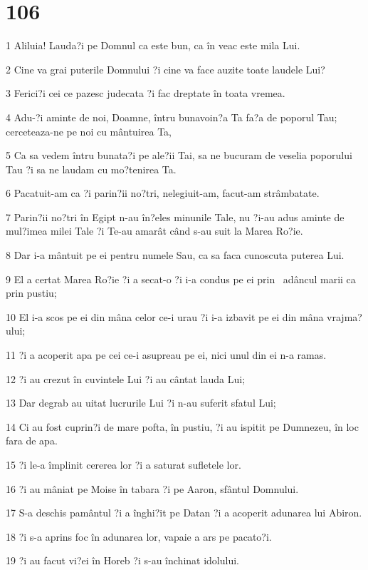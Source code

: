\chapter{106}

\par 1 Aliluia! Lauda?i pe Domnul ca este bun, ca în veac este mila Lui.
\par 2 Cine va grai puterile Domnului ?i cine va face auzite toate laudele Lui?
\par 3 Ferici?i cei ce pazesc judecata ?i fac dreptate în toata vremea.
\par 4 Adu-?i aminte de noi, Doamne, întru bunavoin?a Ta fa?a de poporul Tau; cerceteaza-ne pe noi cu mântuirea Ta,
\par 5 Ca sa vedem întru bunata?i pe ale?ii Tai, sa ne bucuram de veselia poporului Tau ?i sa ne laudam cu mo?tenirea Ta.
\par 6 Pacatuit-am ca ?i parin?ii no?tri, nelegiuit-am, facut-am strâmbatate.
\par 7 Parin?ii no?tri în Egipt n-au în?eles minunile Tale, nu ?i-au adus aminte de mul?imea milei Tale ?i Te-au amarât când s-au suit la Marea Ro?ie.
\par 8 Dar i-a mântuit pe ei pentru numele Sau, ca sa faca cunoscuta puterea Lui.
\par 9 El a certat Marea Ro?ie ?i a secat-o ?i i-a condus pe ei prin  adâncul marii ca prin pustiu;
\par 10 El i-a scos pe ei din mâna celor ce-i urau ?i i-a izbavit pe ei din mâna vrajma?ului;
\par 11 ?i a acoperit apa pe cei ce-i asupreau pe ei, nici unul din ei n-a ramas.
\par 12 ?i au crezut în cuvintele Lui ?i au cântat lauda Lui;
\par 13 Dar degrab au uitat lucrurile Lui ?i n-au suferit sfatul Lui;
\par 14 Ci au fost cuprin?i de mare pofta, în pustiu, ?i au ispitit pe Dumnezeu, în loc fara de apa.
\par 15 ?i le-a împlinit cererea lor ?i a saturat sufletele lor.
\par 16 ?i au mâniat pe Moise în tabara ?i pe Aaron, sfântul Domnului.
\par 17 S-a deschis pamântul ?i a înghi?it pe Datan ?i a acoperit adunarea lui Abiron.
\par 18 ?i s-a aprins foc în adunarea lor, vapaie a ars pe pacato?i.
\par 19 ?i au facut vi?ei în Horeb ?i s-au închinat idolului.
